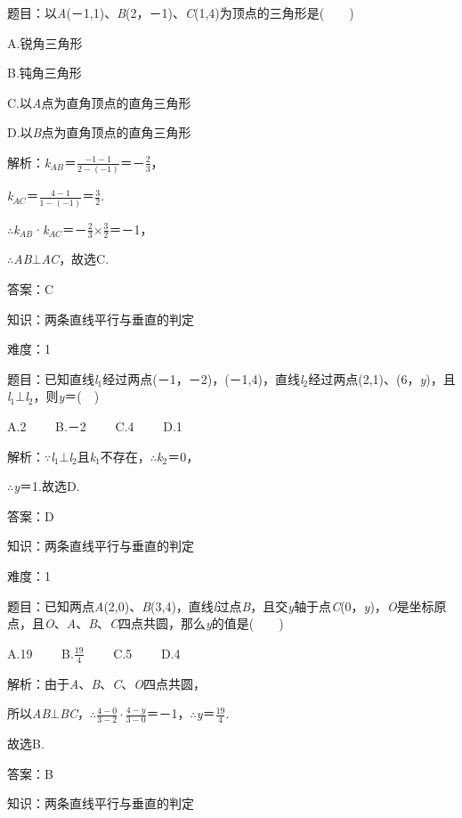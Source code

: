\documentclass{article} %
\begin{document}
题目：以\textit{A}(－1,1)、\textit{B}(2，－1)、\textit{C}(1,4)为顶点的三角形是(　　)

A.锐角三角形

B.钝角三角形

C.以\textit{A}点为直角顶点的直角三角形

D.以\textit{B}点为直角顶点的直角三角形

解析：\textit{k${}_{AB}$}＝$\frac{-1-1}{2-(-1)}$＝－$\frac{2}{3}$，

\textit{k${}_{AC}$}＝$\frac{4-1}{1-(-1)}$＝$\frac{3}{2}$.

$\mathrm{\therefore}$\textit{k${}_{AB}$}·\textit{k${}_{AC}$}＝－$\frac{2}{3}\mathrm{\times}\frac{3}{2}$＝－1，

$\mathrm{\therefore}$\textit{AB}$\mathrm{\bot}$\textit{AC}，故选C.

答案：C

知识：两条直线平行与垂直的判定

难度：1

题目：已知直线\textit{l}${}_{1}$经过两点(－1，－2)，(－1,4)，直线\textit{l}${}_{2}$经过两点(2,1)、(6，\textit{y})，且\textit{l}${}_{1}$$\mathrm{\bot}$\textit{l}${}_{2}$，则\textit{y}＝(　)

A.2　　 B.－2　　 C.4　　 D.1

解析：$\mathrm{\because}$\textit{l}${}_{1}$$\mathrm{\bot}$\textit{l}${}_{2}$且\textit{k}${}_{1}$不存在，$\mathrm{\therefore}$\textit{k}${}_{2}$＝0，

$\mathrm{\therefore}$\textit{y}＝1.故选D.

答案：D

知识：两条直线平行与垂直的判定

难度：1

题目：已知两点\textit{A}(2,0)、\textit{B}(3,4)，直线\textit{l}过点\textit{B}，且交\textit{y}轴于点\textit{C}(0，\textit{y})，\textit{O}是坐标原点，且\textit{O}、\textit{A}、\textit{B}、\textit{C}四点共圆，那么\textit{y}的值是(　　)

A.19　　 B.$\frac{19}{4}$　　 C.5　　 D.4

解析：由于\textit{A}、\textit{B}、\textit{C}、\textit{O}四点共圆，



所以\textit{AB}$\mathrm{\bot}$\textit{BC}，$\mathrm{\therefore}\frac{4-0}{3-2}\cdot\frac{4-y}{3-0}$＝－1，$\mathrm{\therefore}$\textit{y}＝$\frac{19}{4}$.

故选B.

答案：B


知识：两条直线平行与垂直的判定
\end{document}
